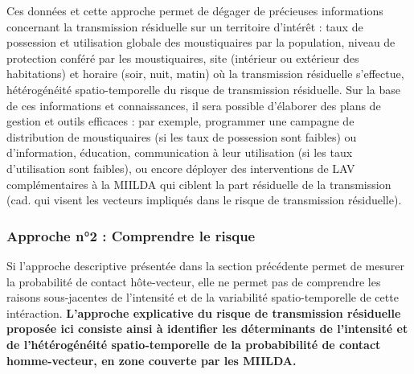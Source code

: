 \documentclass[12pt,twoside]{reedthesis}
\begin{document}
Ces données et cette approche permet de dégager de précieuses informations concernant la transmission résiduelle sur un territoire d'intérêt : taux de possession et utilisation globale des moustiquaires par la population, niveau de protection conféré par les moustiquaires, site (intérieur ou extérieur des habitations) et horaire (soir, nuit, matin) où la transmission résiduelle s'effectue, hétérogénéité spatio-temporelle du risque de transmission résiduelle. Sur la base de ces informations et connaissances, il sera possible d'élaborer des plans de gestion et outils efficaces : par exemple, programmer une campagne de distribution de moustiquaires (si les taux de possession sont faibles) ou d'information, éducation, communication à leur utilisation (si les taux d'utilisation sont faibles), ou encore déployer des interventions de LAV complémentaires à la MIILDA qui ciblent la part résiduelle de la transmission (cad. qui visent les vecteurs impliqués dans le risque de transmission résiduelle).\\

\hypertarget{explain-risk}{%
\subsubsection{Approche n°2 : Comprendre le risque}\label{explain-risk}}

Si l'approche descriptive présentée dans la section précédente permet de mesurer la probabilité de contact hôte-vecteur, elle ne permet pas de comprendre les raisons sous-jacentes de l'intensité et de la variabilité spatio-temporelle de cette intéraction. \textbf{L'approche explicative du risque de transmission résiduelle proposée ici consiste ainsi à identifier les déterminants de l'intensité et de l'hétérogénéité spatio-temporelle de la probabibilité de contact homme-vecteur, en zone couverte par les MIILDA.}\\
\end{document}
